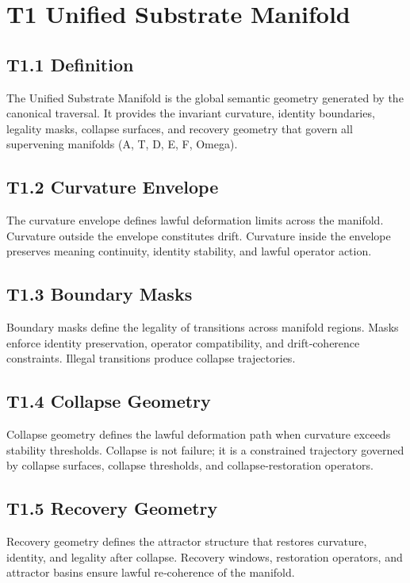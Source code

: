 
\section{T1 Unified Substrate Manifold}

\subsection{T1.1 Definition}
The Unified Substrate Manifold is the global semantic geometry generated by the
canonical traversal. It provides the invariant curvature, identity boundaries,
legality masks, collapse surfaces, and recovery geometry that govern all
supervening manifolds (A, T, D, E, F, Omega).

\subsection{T1.2 Curvature Envelope}
The curvature envelope defines lawful deformation limits across the manifold.
Curvature outside the envelope constitutes drift. Curvature inside the envelope
preserves meaning continuity, identity stability, and lawful operator action.

\subsection{T1.3 Boundary Masks}
Boundary masks define the legality of transitions across manifold regions.
Masks enforce identity preservation, operator compatibility, and drift‑coherence
constraints. Illegal transitions produce collapse trajectories.

\subsection{T1.4 Collapse Geometry}
Collapse geometry defines the lawful deformation path when curvature exceeds
stability thresholds. Collapse is not failure; it is a constrained trajectory
governed by collapse surfaces, collapse thresholds, and collapse‑restoration
operators.

\subsection{T1.5 Recovery Geometry}
Recovery geometry defines the attractor structure that restores curvature,
identity, and legality after collapse. Recovery windows, restoration operators,
and attractor basins ensure lawful re‑coherence of the manifold.

